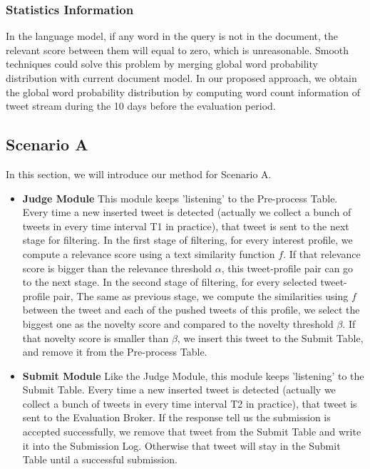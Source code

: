 \subsubsection{Statistics Information}
In the language model, if any word in the query is not in the document,
the relevant score between them will equal to zero, which is unreasonable.
Smooth techniques could solve this problem by merging global word
probability distribution with current document model.
In our proposed approach, we obtain the global word probability distribution
by computing word count information of tweet stream during the 10 days before the evaluation period.

\subsection{Scenario A}
In this section, we will introduce our method for Scenario A.

\begin{itemize}
\item \textbf{Judge Module}
This module keeps 'listening' to the Pre-process Table. 
Every time a new inserted tweet is detected
(actually we collect a bunch of tweets in every time interval T1 in practice), 
that tweet is sent to the next stage for filtering. 
In the first stage of filtering, for every interest profile, we compute a relevance score 
using a text similarity function $f$. 
If that relevance score is bigger than the relevance threshold $\alpha$, 
this tweet-profile pair can go to the next stage.
In the second stage of filtering, for every selected tweet-profile pair, 
The same as previous stage, 
we compute the similarities using $f$ between the tweet and each of the pushed tweets of this profile,
we select the biggest one as the novelty score and compared to the novelty threshold $\beta$.
If that novelty score is smaller than $\beta$, 
we insert this tweet to the Submit Table, and remove it from the Pre-process Table.  
\item \textbf{Submit Module}
Like the Judge Module, this module keeps 'listening' to the Submit Table.
Every time a new inserted tweet is detected
(actually we collect a bunch of tweets in every time interval T2 in practice), 
that tweet is sent to the Evaluation Broker. 
If the response tell us the submission is accepted successfully,
we remove that tweet from the Submit Table and write it into the Submission Log.
Otherwise that tweet will stay in the Submit Table until a successful submission. 
\end{itemize} 


